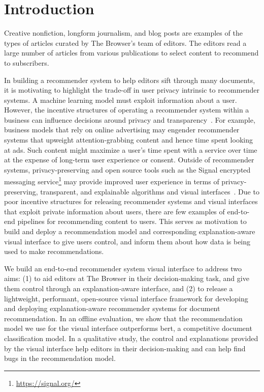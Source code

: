 \section{Introduction}
\label{sec:introduction}
Creative nonfiction, longform journalism, and blog posts are examples of the types of articles curated by The Browser's team of editors. The editors read a large number of articles from various publications to select content to recommend to subscribers.

In building a recommender system to help editors sift through many documents, it is motivating to highlight the trade-off in user privacy intrinsic to recommender systems. A machine learning model must exploit information about a user. However, the incentive structures of operating a recommender system within a business can influence decisions around privacy and transparency~\citep{diakopoulos2020oxford}. For example, business models that rely on online advertising may engender recommender systems that upweight attention-grabbing content and hence time spent looking at ads. Such content might maximize a user's time spent with a service over time at the expense of long-term user experience or consent. Outside of recommender systems, privacy-preserving and open source tools such as the Signal encrypted messaging service\footnote{\url{https://signal.org/}} may provide improved user experience in terms of privacy-preserving, transparent, and explainable algorithms and visual interfaces~\citep{cohn-gordon2017a-formal}. Due to poor incentive structures for releasing recommender systems and visual interfaces that exploit private information about users, there are few examples of end-to-end pipelines for recommending content to users. This serves as motivation to build and deploy a recommendation model and corresponding explanation-aware visual interface to give users control, and inform them about how data is being used to make recommendations.

We build an end-to-end recommender system visual interface to address two aims: (1) to aid editors at The Browser in their decision-making task, and give them control through an explanation-aware interface, and (2) to release a lightweight, performant, open-source visual interface framework for developing and deploying explanation-aware recommender systems for document recommendation. In an offline evaluation, we show that the recommendation model we use for the visual interface outperforms \acrshort{bert}, a competitive document classification model. In a qualitative study, the control and explanations provided by the visual interface help editors in their decision-making and can help find bugs in the recommendation model.
